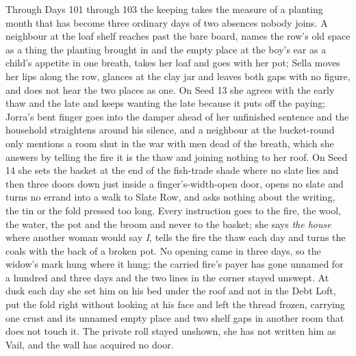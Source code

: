 \documentclass{design/chronicle}
\begin{document}
{Through Days 101 through 103 the keeping takes the measure of a planting month that has become three ordinary days of two absences nobody joins. A neighbour at the loaf shelf reaches past the bare board, names the row’s old space as a thing the planting brought in and the empty place at the boy’s ear as a child’s appetite in one breath, takes her loaf and goes with her pot; Sella moves her lips along the row, glances at the clay jar and leaves both gaps with no figure, and does not hear the two places as one. On Seed 13 she agrees with the early thaw and the late and keeps wanting the late because it puts off the paying; Jorra’s bent finger goes into the damper ahead of her unfinished sentence and the household straightens around his silence, and a neighbour at the bucket-round only mentions a room shut in the war with men dead of the breath, which she answers by telling the fire it is the thaw and joining nothing to her roof. On Seed 14 she sets the basket at the end of the fish-trade shade where no slate lies and then three doors down just inside a finger’s-width-open door, opens no slate and turns no errand into a walk to Slate Row, and asks nothing about the writing, the tin or the fold pressed too long. Every instruction goes to the fire, the wool, the water, the pot and the broom and never to the basket; she says \emph{the house} where another woman would say \emph{I}, tells the fire the thaw each day and turns the coals with the back of a broken pot. No opening came in three days, so the widow’s mark hung where it hung; the carried fire’s payer has gone unnamed for a hundred and three days and the two lines in the corner stayed unswept. At dusk each day she set him on his bed under the roof and not in the Debt Loft, put the fold right without looking at his face and left the thread frozen, carrying one crust and its unnamed empty place and two shelf gaps in another room that does not touch it. The private roll stayed unshown, she has not written him as Vail, and the wall has acquired no door.

}
\end{document}
